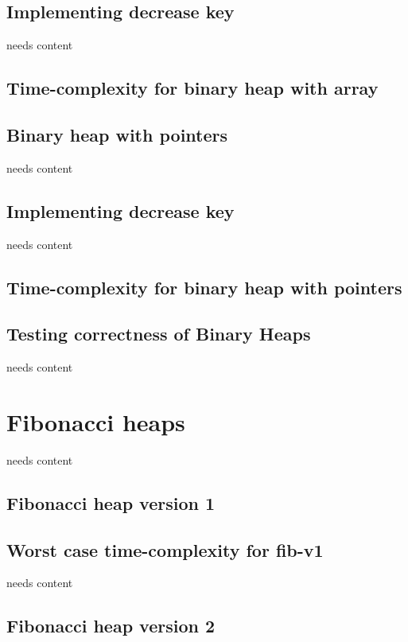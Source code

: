 \documentclass[12pt,a4paper,twoside,danish,article]{memoir}
\begin{document}
\section{Implementing decrease key}

needs content

\section{Time-complexity for binary heap with array}

\section{Binary heap with pointers}

needs content

\section{Implementing decrease key}

needs content

\section{Time-complexity for binary heap with pointers}

\section{Testing correctness of Binary Heaps}

needs content

\chapter{Fibonacci heaps}

needs content

\section{Fibonacci heap version 1}


\section{Worst case time-complexity for fib-v1}

needs content

\section{Fibonacci heap version 2}
\end{document}
